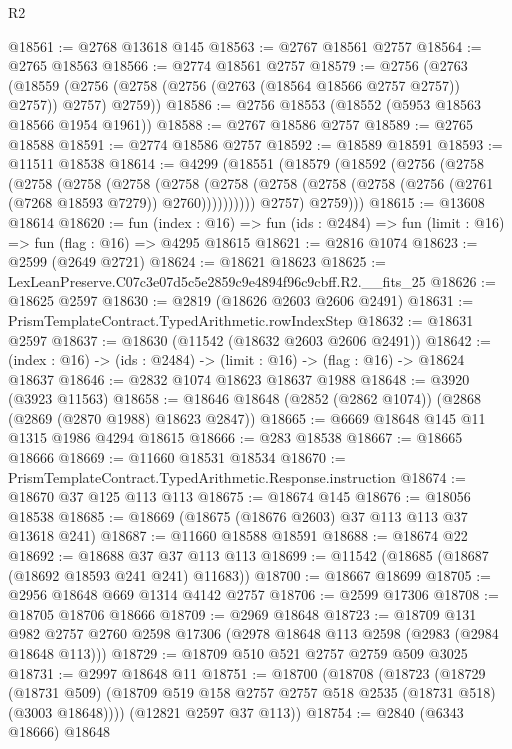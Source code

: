 \begin{lexlean}{R2}
\begin{coremodule}
@18561 := @2768 @13618 @145
@18563 := @2767 @18561 @2757
@18564 := @2765 @18563
@18566 := @2774 @18561 @2757
@18579 := @2756
    (@2763 (@18559 (@2756 (@2758 (@2756 (@2763 (@18564 @18566 @2757 @2757)) @2757)) @2757) @2759))
@18586 := @2756 @18553 (@18552 (@5953 @18563 @18566 @1954 @1961))
@18588 := @2767 @18586 @2757
@18589 := @2765 @18588
@18591 := @2774 @18586 @2757
@18592 := @18589 @18591
@18593 := @11511 @18538
@18614 := @4299
    (@18551
      (@18579
        (@18592
          (@2756
            (@2758
              (@2758
                (@2758
                  (@2758
                    (@2758
                      (@2758
                        (@2758 (@2758 (@2758 (@2756 (@2761 (@7268 @18593 @7279)) @2760))))))))))
            @2757)
          @2759)))
@18615 := @13608 @18614
@18620 := fun (index : @16) =>
  fun (ids : @2484) => fun (limit : @16) => fun (flag : @16) => @4295 @18615
@18621 := @2816 @1074
@18623 := @2599 (@2649 @2721)
@18624 := @18621 @18623
@18625 := LexLeanPreserve.C07c3e07d5c5e2859c9e4894f96c9cbff.R2.__fits_25
@18626 := @18625 @2597
@18630 := @2819 (@18626 @2603 @2606 @2491)
@18631 := PrismTemplateContract.TypedArithmetic.rowIndexStep
@18632 := @18631 @2597
@18637 := @18630 (@11542 (@18632 @2603 @2606 @2491))
@18642 := (index : @16) -> (ids : @2484) -> (limit : @16) -> (flag : @16) -> @18624 @18637
@18646 := @2832 @1074 @18623 @18637 @1988
@18648 := @3920 (@3923 @11563)
@18658 := @18646 @18648 (@2852 (@2862 @1074)) (@2868 (@2869 (@2870 @1988) @18623 @2847))
@18665 := @6669 @18648 @145 @11 @1315 @1986 @4294 @18615
@18666 := @283 @18538
@18667 := @18665 @18666
@18669 := @11660 @18531 @18534
@18670 := PrismTemplateContract.TypedArithmetic.Response.instruction
@18674 := @18670 @37 @125 @113 @113
@18675 := @18674 @145
@18676 := @18056 @18538
@18685 := @18669 (@18675 (@18676 @2603) @37 @113 @113 @37 @13618 @241)
@18687 := @11660 @18588 @18591
@18688 := @18674 @22
@18692 := @18688 @37 @37 @113 @113
@18699 := @11542 (@18685 (@18687 (@18692 @18593 @241 @241) @11683))
@18700 := @18667 @18699
@18705 := @2956 @18648 @669 @1314 @4142 @2757
@18706 := @2599 @17306
@18708 := @18705 @18706 @18666
@18709 := @2969 @18648
@18723 := @18709
    @131
    @982
    @2757
    @2760
    @2598
    @17306
    (@2978 @18648 @113 @2598 (@2983 (@2984 @18648 @113)))
@18729 := @18709 @510 @521 @2757 @2759 @509 @3025
@18731 := @2997 @18648 @11
@18751 := @18700
    (@18708
      (@18723
        (@18729
          (@18731 @509)
          (@18709 @519 @158 @2757 @2757 @518 @2535 (@18731 @518) (@3003 @18648))))
      (@12821 @2597 @37 @113))
@18754 := @2840 (@6343 @18666) @18648

\end{coremodule}
\end{lexlean}
